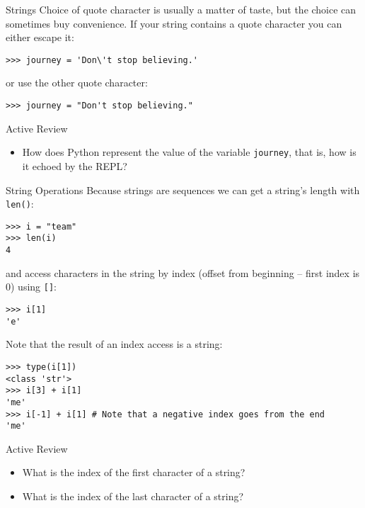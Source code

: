 \documentclass[smaller, aspectratio=1610]{beamer}
\begin{document}
\begin{frame}[label={sec:orgfd446b1},fragile]{Strings}
 Choice of quote character is usually a matter of taste, but the choice can sometimes buy convenience. If your string contains a quote character you can either escape it:

\lstset{language=Python,label= ,caption= ,captionpos=b,numbers=none}
\begin{lstlisting}
>>> journey = 'Don\'t stop believing.'
\end{lstlisting}

or use the other quote character:

\lstset{language=Python,label= ,caption= ,captionpos=b,numbers=none}
\begin{lstlisting}
>>> journey = "Don't stop believing."
\end{lstlisting}

\begin{block}{Active Review}
\begin{itemize}
\item How does Python represent the value of the variable \texttt{journey}, that is, how is it echoed by the REPL?
\end{itemize}
\end{block}
\end{frame}

\begin{frame}[label={sec:orgecc9232},fragile]{String Operations}
 Because strings are sequences we can get a string's length with \texttt{len()}:

\lstset{language=Python,label= ,caption= ,captionpos=b,numbers=none}
\begin{lstlisting}
>>> i = "team"
>>> len(i)
4
\end{lstlisting}

and access characters in the string by index (offset from beginning – first index is 0) using \texttt{[]}:

\lstset{language=Python,label= ,caption= ,captionpos=b,numbers=none}
\begin{lstlisting}
>>> i[1]
'e'
\end{lstlisting}

Note that the result of an index access is a string:

\lstset{language=Python,label= ,caption= ,captionpos=b,numbers=none}
\begin{lstlisting}
>>> type(i[1])
<class 'str'>
>>> i[3] + i[1]
'me'
>>> i[-1] + i[1] # Note that a negative index goes from the end
'me'
\end{lstlisting}

\begin{block}{Active Review}
\begin{itemize}
\item What is the index of the first character of a string?
\item What is the index of the last character of a string?
\end{itemize}
\end{block}
\end{frame}
\end{document}
